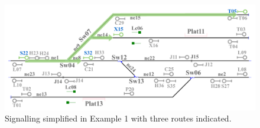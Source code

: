     \lipsum[1-2]
    
    \begin{figure}[h]
    	\centering
    	\includegraphics[width=1\textwidth]{Figuras/Figure11.pdf}
    	\centering\caption{Signalling simplified in Example 1 with three routes indicated.}
    	\label{fig:Routes}
    \end{figure}
    
    
    
    \lipsum[1-3]